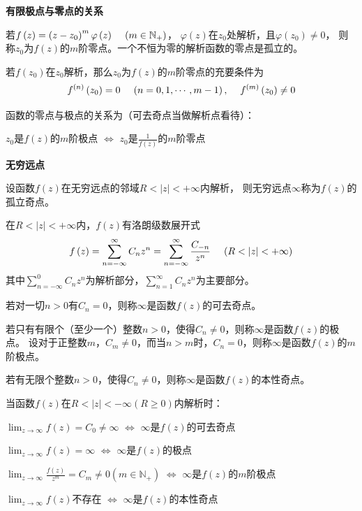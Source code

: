 \documentclass[a4paper,12pt]{article}
\begin{document}
\noindent
\textbf{有限极点与零点的关系}

若$f\left(z\right)=\left(z-z_0\right)^m\varphi\left(z\right)\kern 12pt\left(m\in\mathbb{N}_+\right)$，
$\varphi\left(z\right)$在$z_0$处解析，且$\varphi\left(z_0\right)\ne0$，
则称$z_0$为$f\left(z\right)$的$m$阶零点。一个不恒为零的解析函数的零点是孤立的。

若$f\left(z_0\right)$在$z_0$解析，那么$z_0$为$f\left(z\right)$的$m$阶零点的充要条件为
$$
f^{\left(n\right)}\left(z_0\right)=0\kern 12pt
\left(n=0,1,\cdots,m-1\right),\kern 12pt
f^{\left(m\right)}\left(z_0\right)\ne0
$$

函数的零点与极点的关系为（可去奇点当做解析点看待）：
\begin{center}
    $z_0$是$f\left(z\right)$的$m$阶极点
    $\Longleftrightarrow$
    $z_0$是$\frac1{f\left(z\right)}$的$m$阶零点
\end{center}

\noindent
\textbf{无穷远点}

设函数$f\left(z\right)$在无穷远点的邻域$R<\left|z\right|<+\infty$内解析，
则无穷远点$\infty$称为$f\left(z\right)$的孤立奇点。

在$R<\left|z\right|<+\infty$内，$f\left(z\right)$有洛朗级数展开式
$$
f\left(z\right)=\sum_{n=-\infty}^\infty C_nz^n
=\sum_{n=-\infty}^\infty \frac{C_{-n}}{z^n}
\kern 12pt\left(R<\left|z\right|<+\infty\right)
$$
其中$\sum_{n=-\infty}^0 C_nz^n$为解析部分，$\sum_{n=1}^\infty C_nz^n$为主要部分。

若对一切$n>0$有$C_n=0$，则称$\infty$是函数$f\left(z\right)$的可去奇点。

若只有有限个（至少一个）整数$n>0$，使得$C_n\ne0$，则称$\infty$是函数$f\left(z\right)$的极点。
设对于正整数$m$，$C_m\ne0$，而当$n>m$时，$C_n=0$，则称$\infty$是函数$f\left(z\right)$的$m$阶极点。

若有无限个整数$n>0$，使得$C_n\ne0$，则称$\infty$是函数$f\left(z\right)$的本性奇点。

当函数$f\left(z\right)$在$R<\left|z\right|<-\infty\left(R\ge0\right)$内解析时：
\begin{center}
    $\lim_{z\to\infty}f\left(z\right)=C_0\ne\infty$
    $\Longleftrightarrow$
    $\infty$是$f\left(z\right)$的可去奇点

    $\lim_{z\to\infty}f\left(z\right)=\infty$
    $\Longleftrightarrow$
    $\infty$是$f\left(z\right)$的极点

    $\lim_{z\to\infty}\frac{f\left(z\right)}{z^m}=C_{m}\ne0\left(m\in\mathbb{N}_+\right)$
    $\Longleftrightarrow$
    $\infty$是$f\left(z\right)$的$m$阶极点

    $\lim_{z\to\infty}f\left(z\right)$不存在
    $\Longleftrightarrow$
    $\infty$是$f\left(z\right)$的本性奇点
\end{center}
\end{document}
